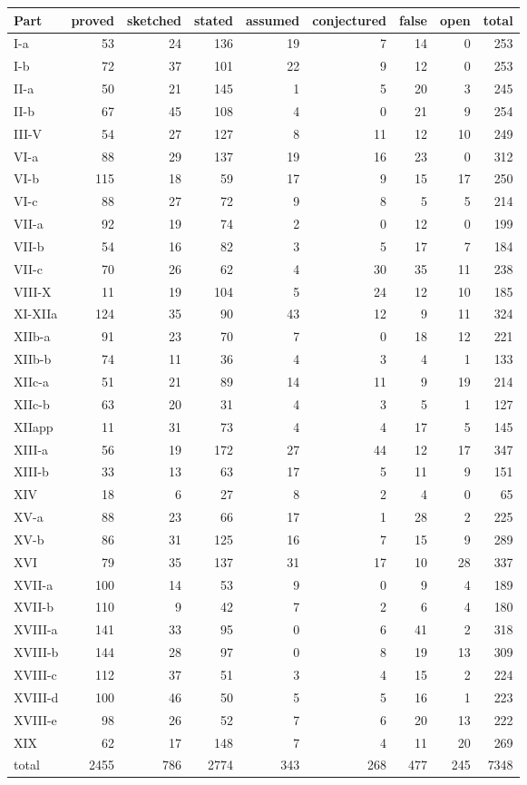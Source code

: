 \documentclass[11pt,oneside]{book}
\DeclareRobustCommand{\[}{\begingroup\global\DERtaggedfalse\gdef\DERtagbody{}%
  \let\tag\DERtag\let\split\aligned\let\endsplit\endaligned\global\setbox\DERdispbox\hbox\bgroup$\displaystyle}
\DeclareRobustCommand{\]}{$\egroup\endgroup\DERshowdisplay}
\begin{document}
\begin{center}\small
\begin{tabular}{lrrrrrrrr}
\toprule
Part & proved & sketched & stated & assumed & conjectured & false & open & total \\
\midrule
I-a & 53 & 24 & 136 & 19 & 7 & 14 & 0 & 253 \\
I-b & 72 & 37 & 101 & 22 & 9 & 12 & 0 & 253 \\
II-a & 50 & 21 & 145 & 1 & 5 & 20 & 3 & 245 \\
II-b & 67 & 45 & 108 & 4 & 0 & 21 & 9 & 254 \\
III-V & 54 & 27 & 127 & 8 & 11 & 12 & 10 & 249 \\
VI-a & 88 & 29 & 137 & 19 & 16 & 23 & 0 & 312 \\
VI-b & 115 & 18 & 59 & 17 & 9 & 15 & 17 & 250 \\
VI-c & 88 & 27 & 72 & 9 & 8 & 5 & 5 & 214 \\
VII-a & 92 & 19 & 74 & 2 & 0 & 12 & 0 & 199 \\
VII-b & 54 & 16 & 82 & 3 & 5 & 17 & 7 & 184 \\
VII-c & 70 & 26 & 62 & 4 & 30 & 35 & 11 & 238 \\
VIII-X & 11 & 19 & 104 & 5 & 24 & 12 & 10 & 185 \\
XI-XIIa & 124 & 35 & 90 & 43 & 12 & 9 & 11 & 324 \\
XIIb-a & 91 & 23 & 70 & 7 & 0 & 18 & 12 & 221 \\
XIIb-b & 74 & 11 & 36 & 4 & 3 & 4 & 1 & 133 \\
XIIc-a & 51 & 21 & 89 & 14 & 11 & 9 & 19 & 214 \\
XIIc-b & 63 & 20 & 31 & 4 & 3 & 5 & 1 & 127 \\
XIIapp & 11 & 31 & 73 & 4 & 4 & 17 & 5 & 145 \\
XIII-a & 56 & 19 & 172 & 27 & 44 & 12 & 17 & 347 \\
XIII-b & 33 & 13 & 63 & 17 & 5 & 11 & 9 & 151 \\
XIV & 18 & 6 & 27 & 8 & 2 & 4 & 0 & 65 \\
XV-a & 88 & 23 & 66 & 17 & 1 & 28 & 2 & 225 \\
XV-b & 86 & 31 & 125 & 16 & 7 & 15 & 9 & 289 \\
XVI & 79 & 35 & 137 & 31 & 17 & 10 & 28 & 337 \\
XVII-a & 100 & 14 & 53 & 9 & 0 & 9 & 4 & 189 \\
XVII-b & 110 & 9 & 42 & 7 & 2 & 6 & 4 & 180 \\
XVIII-a & 141 & 33 & 95 & 0 & 6 & 41 & 2 & 318 \\
XVIII-b & 144 & 28 & 97 & 0 & 8 & 19 & 13 & 309 \\
XVIII-c & 112 & 37 & 51 & 3 & 4 & 15 & 2 & 224 \\
XVIII-d & 100 & 46 & 50 & 5 & 5 & 16 & 1 & 223 \\
XVIII-e & 98 & 26 & 52 & 7 & 6 & 20 & 13 & 222 \\
XIX & 62 & 17 & 148 & 7 & 4 & 11 & 20 & 269 \\
\midrule
total & 2455 & 786 & 2774 & 343 & 268 & 477 & 245 & 7348 \\
\bottomrule
\end{tabular}
\end{center}
\end{document}
